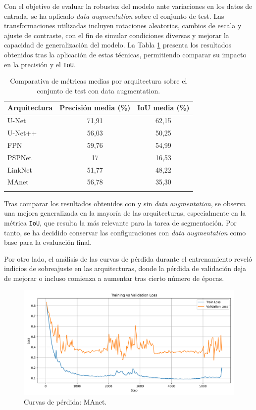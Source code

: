 Con el objetivo de evaluar la robustez del modelo ante variaciones en los datos de entrada, se ha aplicado \textit{data augmentation} sobre el conjunto de test. Las transformaciones utilizadas incluyen rotaciones aleatorias, cambios de escala y ajuste de contraste, con el fin de simular condiciones diversas y mejorar la capacidad de generalización del modelo. La Tabla \ref{tab:resultados_condataaumentation} presenta los resultados obtenidos tras la aplicación de estas técnicas, permitiendo comparar su impacto en la precisión y el \texttt{IoU}.

\begin{table}[h]
    \centering
    \begin{tabular}{lcc}
    \textbf{Arquitectura} & \textbf{Precisión media (\%)} & \textbf{IoU media (\%)} \\
    \hline
    U-Net             & 71,91 & 62,15\\
    U-Net++           & 56,03 & 50,25\\
    FPN               & 59,76 & 54,99\\
    PSPNet            & 17 & 16,53\\
    LinkNet           & 51,77 & 48,22\\
    MAnet             & 56,78 & 35,30\\
    \hfill
    \end{tabular}
    \caption{Comparativa de métricas medias por arquitectura sobre el conjunto de test con data augmentation.} \label{tab:resultados_condataaumentation}
\end{table}

 Tras comparar los resultados obtenidos con y sin \textit{data augmentation}, se observa una mejora generalizada en la mayoría de las arquitecturas, especialmente en la métrica \texttt{IoU}, que resulta la más relevante para la tarea de segmentación. Por tanto, se ha decidido conservar las configuraciones con \textit{data augmentation} como base para la evaluación final.

 Por otro lado, el análisis de las curvas de pérdida durante el entrenamiento reveló indicios de sobreajuste en las arquitecturas, donde la pérdida de validación deja de mejorar o incluso comienza a aumentar tras cierto número de épocas. 

\begin{figure}[h]
    \centering
    \includegraphics[width= \textwidth]{img/training_vs_validation_loss_manet.png}
    \caption{Curvas de pérdida: MAnet.}
    \label{fig:loss_manet}
\end{figure}

